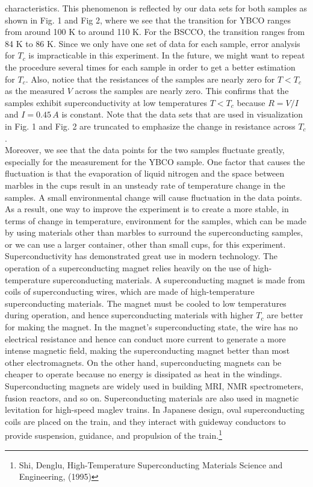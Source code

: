 \documentclass[11pt]{book}
\theoremstyle{break}
\theoremstyle{break}
\begin{document}
characteristics. This phenomenon is reflected by our data sets for both samples as shown in Fig. 1 and Fig 2, where we see that the transition for YBCO ranges from around 100 K to around 110 K. For the BSCCO, the transition ranges from 84 K to 86 K. Since we only have one set of data for each sample, error analysis for $T_c$ is impracticable in this experiment. In the future, we might want to repeat the procedure several times for each sample in order to get a better estimation for $T_c$. Also, notice that the resistances of the samples are nearly zero for $T<T_c$ as the measured $V$ across the samples are nearly zero. This confirms that the samples exhibit superconductivity at low temperatures $T<T_c$ because $R = V/I$ and $I = 0.45\, A$ is constant. Note that the data sets that are used in visualization in Fig. 1 and Fig. 2 are truncated to emphasize the change in resistance across $T_c$. \\

Moreover, we see that the data points for the two samples fluctuate greatly, especially for the measurement for the YBCO sample. One factor that causes the fluctuation is that the evaporation of liquid nitrogen and the space between marbles in the cups result in an unsteady rate of temperature change in the samples. A small environmental change will cause fluctuation in the data points. As a result, one way to improve the experiment is to create a more stable, in terms of change in temperature, environment for the samples, which can be made by using materials other than marbles to surround the superconducting samples, or we can use a larger container, other than small cups, for this experiment.\\

Superconductivity has demonstrated great use in modern technology. The operation of a superconducting magnet relies heavily on the use of high-temperature superconducting materials. A superconducting magnet is made from coils of superconducting wires, which are made of high-temperature superconducting materials. The magnet must be cooled to low temperatures during operation, and hence superconducting materials with higher $T_c$ are better for making the magnet. In the magnet's superconducting state, the wire has no electrical resistance and hence can conduct more current to generate a more intense magnetic field, making the superconducting magnet better than most other electromagnets. On the other hand, superconducting magnets can be cheaper to operate because no energy is dissipated as heat in the windings. Superconducting magnets are widely used in building MRI, NMR spectrometers, fusion reactors, and so on. Superconducting materials are also used in magnetic levitation for high-speed maglev trains. In Japanese design, oval superconducting coils are placed on the train, and they interact with guideway conductors to provide suspension, guidance, and propulsion of the train.\footnote{Shi, Denglu, High-Temperature Superconducting Materials Science and Engineering, (1995)}
\end{document}

